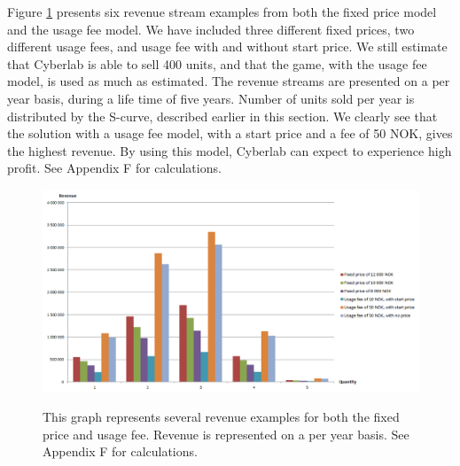 Figure \ref{fig:RevenueAll} presents six revenue stream examples from both the fixed price model and the usage fee model. We have included three different fixed prices, two different usage fees, and usage fee with and without start price. We still estimate that Cyberlab is able to sell 400 units, and that the game, with the usage fee model, is used as much as estimated. The revenue streams are presented on a per year basis, during a life time of five years. Number of units sold per year is distributed by the S-curve, described earlier in this section. We clearly see that the solution with a usage fee model, with a start price and a fee of 50 NOK, gives the highest revenue. By using this model, Cyberlab can expect to experience high profit. See Appendix F for calculations.  

\begin{figure}
\centering
\scalebox{0.55}
{\includegraphics{revenueall}}
\caption[Revenue examples for both fixed price model and usage fee model]{This graph represents several revenue examples for both the fixed price and usage fee. Revenue is represented on a per year basis. See Appendix F for calculations.}
\label{fig:RevenueAll}
\end{figure}

